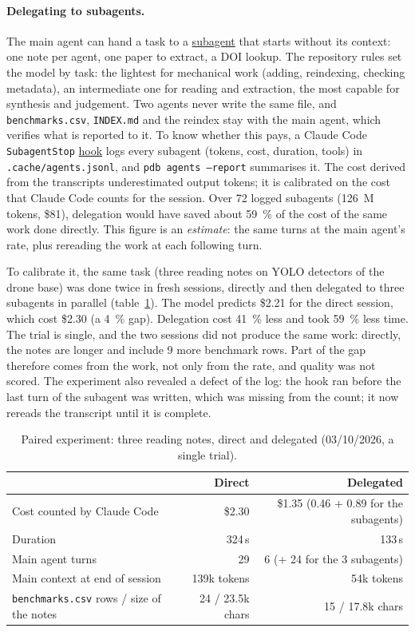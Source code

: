 \documentclass[11pt,a4paper]{article}
\newcommand{\cmd}[1]{\texttt{#1}}
\newcommand{\gl}[2]{\hyperlink{gl:#1}{\textcolor{glcolor}{#2}}}
\begin{document}
\paragraph{Delegating to subagents.}
\label{sec:delegation}
The main agent can hand a task to a \gl{sousagent}{subagent} that starts without its context: one
note per agent, one paper to extract, a DOI lookup. The repository rules set the model by
task: the lightest for mechanical work (adding, reindexing, checking metadata), an
intermediate one for reading and extraction, the most capable for synthesis and judgement. Two
agents never write the same file, and \cmd{benchmarks.csv}, \cmd{INDEX.md} and the reindex
stay with the main agent, which verifies what is reported to it. To know whether this pays,
a Claude Code \cmd{SubagentStop} \gl{hook}{hook} logs every subagent (tokens, cost, duration, tools) in
\cmd{.cache/agents.jsonl}, and \cmd{pdb agents --report} summarises it. The cost derived from
the transcripts underestimated output tokens; it is calibrated on the cost that Claude Code
counts for the session. Over 72 logged subagents (126~M tokens, \$81), delegation would have
saved about 59~\% of the cost of the same work done directly. This figure is an
\emph{estimate}: the same turns at the main agent's rate, plus rereading the work at each
following turn.

To calibrate it, the same task (three reading notes on YOLO detectors of the drone base) was
done twice in fresh sessions, directly and then delegated to three subagents in parallel
(table~\ref{tab:delegation}). The model predicts \$2.21 for the direct session, which cost
\$2.30 (a 4~\% gap). Delegation cost 41~\% less and took 59~\% less time. The trial is single,
and the two sessions did not produce the same work: directly, the notes are longer and include
9 more benchmark rows. Part of the gap therefore comes from the work, not only from the rate,
and quality was not scored. The experiment also revealed a defect of the log: the hook ran
before the last turn of the subagent was written, which was missing from the count; it now
rereads the transcript until it is complete.

\begin{table}[ht]
\centering
\caption{Paired experiment: three reading notes, direct and delegated (03/10/2026, a single
trial).}
\label{tab:delegation}
\small
\begin{tabular}{@{}lrr@{}}
\toprule
 & Direct & Delegated \\
\midrule
Cost counted by Claude Code & \$2.30 & \$1.35 (0.46 + 0.89 for the subagents) \\
Duration & 324\,s & 133\,s \\
Main agent turns & 29 & 6 (+ 24 for the 3 subagents) \\
Main context at end of session & 139k tokens & 54k tokens \\
\cmd{benchmarks.csv} rows / size of the notes & 24 / 23.5k chars & 15 / 17.8k chars \\
\bottomrule
\end{tabular}
\end{table}
\end{document}
